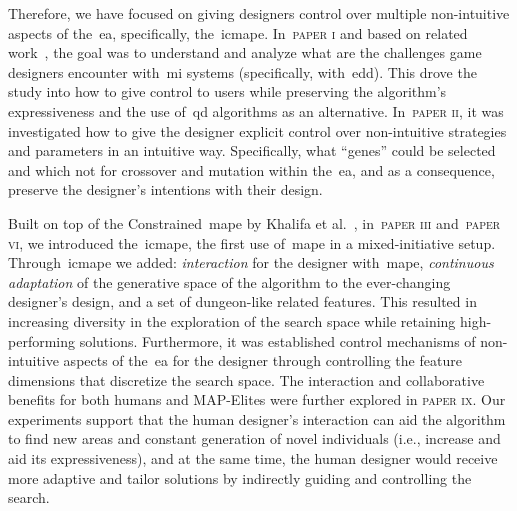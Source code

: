 Therefore, we have focused on giving designers control over multiple non-intuitive aspects of the~\acrshort{ea}, specifically, the~\acrfull{icmape}. In~\textsc{paper i} and based on related work~\cite{baldwin_mixed-initiative_2017}, the goal was to understand and analyze what are the challenges game designers encounter with~\acrshort{mi} systems (specifically, with~\acrshort{edd}). This drove the study into how to give control to users while preserving the algorithm's expressiveness and the use of~\acrshort{qd} algorithms as an alternative. In~\textsc{paper ii}, it was investigated how to give the designer explicit control over non-intuitive strategies and parameters in an intuitive way. Specifically, what ``genes'' could be selected and which not for crossover and mutation within the~\acrshort{ea}, and as a consequence, preserve the designer's intentions with their design. 

Built on top of the Constrained~\acrshort{mape} by Khalifa et al.~\cite{khalifa_talakat_2018}, in~\textsc{paper iii} and~\textsc{paper vi}, we introduced the~\acrlong{icmape}, the first use of~\acrshort{mape} in a mixed-initiative setup. Through~\acrshort{icmape} we added: \textit{interaction} for the designer with~\acrshort{mape}, \textit{continuous adaptation} of the generative space of the algorithm to the ever-changing designer's design, and a set of dungeon-like related features. This resulted in increasing diversity in the exploration of the search space while retaining high-performing solutions. Furthermore, it was established control mechanisms of non-intuitive aspects of the~\acrshort{ea} for the designer through controlling the feature dimensions that discretize the search space. The interaction and collaborative benefits for both humans and MAP-Elites were further explored in \textsc{paper ix}. Our experiments support that the human designer's interaction can aid the algorithm to find new areas and constant generation of novel individuals (i.e., increase and aid its expressiveness), and at the same time, the human designer would receive more adaptive and tailor solutions by indirectly guiding and controlling the search. 

